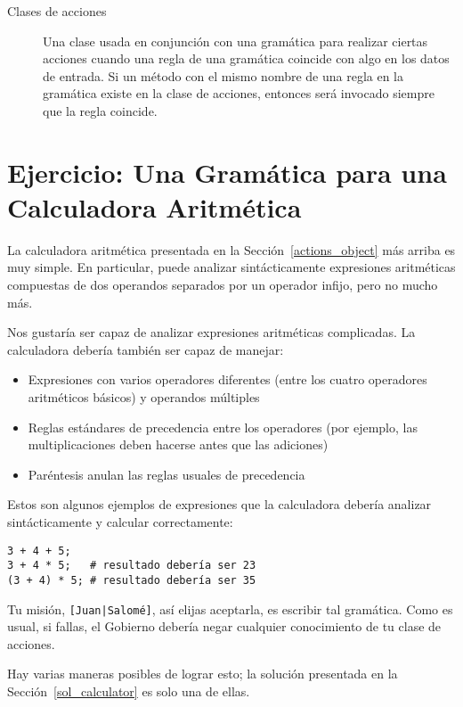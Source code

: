 \begin{description}
\item[Clases de acciones] Una clase usada en conjunción con una gramática
para realizar ciertas acciones cuando una regla de una gramática coincide
con algo en los datos de entrada. Si un método con el mismo nombre
de una regla en la gramática existe en la clase de acciones,
entonces será invocado siempre que la regla coincide.

\end{description}

\section{Ejercicio: Una Gramática para una Calculadora Aritmética}
\label{calculator}

La calculadora aritmética presentada en la Sección~\ref{actions_object}
más arriba es muy simple. En particular, puede analizar sintácticamente
expresiones aritméticas compuestas de dos operandos separados
por un operador infijo, pero no mucho más.

Nos gustaría ser capaz de analizar expresiones aritméticas complicadas.
La calculadora debería también ser capaz de manejar:
\begin{itemize}
\item Expresiones con varios operadores diferentes (entre los
cuatro operadores aritméticos básicos) y operandos múltiples
\item Reglas estándares de precedencia entre los operadores (por ejemplo,
las multiplicaciones deben hacerse antes que las adiciones)
\item Paréntesis anulan las reglas usuales de precedencia
\end{itemize}

Estos son algunos ejemplos de expresiones que la calculadora
debería analizar sintácticamente y calcular correctamente:
\begin{lstlisting}
3 + 4 + 5;
3 + 4 * 5;   # resultado debería ser 23
(3 + 4) * 5; # resultado debería ser 35 
\end{lstlisting}

\begin{exercise}
Tu misión, \verb'[Juan|Salomé]', así elijas aceptarla, es escribir
tal gramática. Como es usual, si fallas, el Gobierno debería negar
cualquier conocimiento de tu clase de acciones.

Hay varias maneras posibles de lograr esto; la solución 
presentada en la Sección~\ref{sol_calculator} es solo una de ellas.
\end{exercise}

